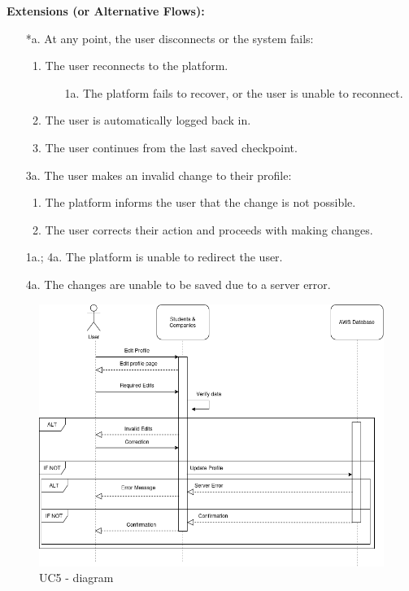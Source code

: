 \begin{itemize}[label={[\textbf{UC}]}, align=left, leftmargin=*]
    \textbf{Extensions (or Alternative Flows):} 
    \begin{enumerate}[label=\arabic*.]
        \item[*a.] At any point, the user disconnects or the system fails:
            \begin{enumerate}[label=\arabic*.]
                \item The user reconnects to the platform.
                    \begin{enumerate}[label=\alph*.]
                        \item[1a.] The platform fails to recover, or the user is unable to reconnect.
                    \end{enumerate}
                 \item The user is automatically logged back in.
                 \item The user continues from the last saved checkpoint.
            \end{enumerate}
        \item[3a.] The user makes an invalid change to their profile:
            \begin{enumerate}[label=\arabic*.]
                \item The platform informs the user that the change is not possible.
                \item The user corrects their action and proceeds with making changes.
            \end{enumerate}
        \item[1a.; 4a.] The platform is unable to redirect the user.
        \item[4a.] The changes are unable to be saved due to a server error.
        \end{enumerate}
\end{itemize}

     \begin{figure}[H]
    	\includegraphics[width=\textwidth,height=\textheight,keepaspectratio]{RASD-Latex/assets/Use Case Diagrams/UC5.png}
    	\caption{UC5 - diagram}
    	\label{fig:DataRequest}
    \end{figure}


